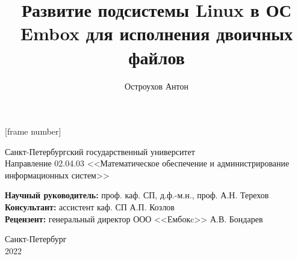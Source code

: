 \documentclass[english,russian,aspectratio=169]{beamer}
\title{Развитие подсистемы Linux в ОС Embox для исполнения двоичных файлов}
\author{Остроухов Антон}
\date{}
\begin{document}
[frame number]

\begin{frame}[plain]
\titlepage

\vspace{-50pt}

\begin{center}
  \scriptsize{
    Санкт-Петербургский государственный университет
    \\[2mm]Направление 02.04.03 <<Математическое обеспечение и администрирование информационных систем>>
  }
\end{center}

\vspace{10pt}

\scriptsize{
  \textbf{Научный руководитель:} проф. каф. СП, д.ф.-м.н., проф. А.Н. Терехов
  \\\textbf{Консультант:} ассистент каф. СП А.П. Козлов
  \\\textbf{Рецензент:} генеральный директор ООО <<Ембокc>> А.В. Бондарев
}

\vspace{28pt}

\begin{center}
  \scriptsize{
  Санкт-Петербург
  \\2022
  }
\end{center}
\end{frame}
\end{document}
